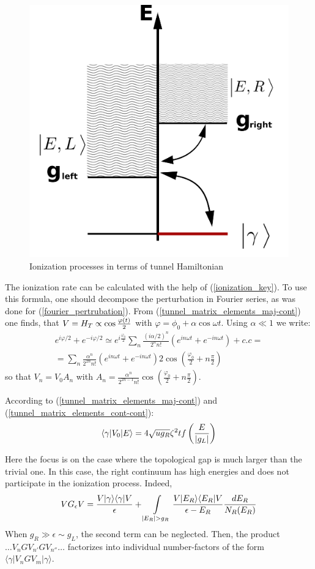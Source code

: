 \begin{figure}[H]
	\centering
	\includegraphics[width=0.6\linewidth]{images/tunneling}
	\caption{Ionization processes in terms of tunnel Hamiltonian}
	\label{fig:tunneling}
\end{figure}

The ionization rate can be calculated with the help of  (\ref{ionization_key}). To use this formula, one should decompose the  perturbation in Fourier series, as was done for (\ref{fourier_pertrubation}). From  (\ref{tunnel_matrix_elements_maj-cont}) one finds, that $ V=H_T\propto\cos\frac{\varphi\left(t\right)}{2} $ with $ \varphi=\phi_{0}+\alpha\cos\omega t $. Using $ \alpha\ll1 $ we write:
\begin{multline}
	e^{i\varphi/2}+e^{-i\varphi/2}\simeq e^{i\frac{\varphi_{0}}{2}}\sum_{n}\frac{(i\alpha/2)^{n}}{2^{n}n!}(e^{in\omega t}+e^{-in\omega t})+c.c=\\=\sum_{n}\frac{\alpha{}^{n}}{2^{2n}n!}(e^{in\omega t}+e^{-in\omega t})2\cos\left(\frac{\varphi_{0}}{2}+n\frac{\pi}{2}\right)
\end{multline}
so that $ V_{n}=V_{0}A_{n} $ with $ A_{n}=\frac{\alpha^{n}}{2^{2n-1}n!}\cos\left(\frac{\varphi_{0}}{2}+n\frac{\pi}{2}\right) $.

According to (\ref{tunnel_matrix_elements_maj-cont}) and (\ref{tunnel_matrix_elements_cont-cont}):
\begin{gather}
\label{tunnel_element_factorized}
	\langle\gamma|V_{0}|E\rangle=4\sqrt{ug_{R}}\zeta^{2}tf\left(\frac{E}{\left|g_L\right|}\right)
\end{gather}

Here the focus is on the case where the topological gap is much larger than the trivial one. In this case, the right continuum has high energies and does not participate in the ionization process. Indeed,
\begin{gather}
	VG_{\epsilon}V=\frac{V|\gamma\rangle\langle\gamma|V}{\epsilon}+\intop_{|E_{R}|>g_{R}}\frac{V|E_{R}\rangle\langle E_{R}|V}{\epsilon-E_{R}}\frac{dE_{R}}{N_{R}(E_{R})}
\end{gather}
When $ g_{R}\gg\epsilon\sim g_{L} $, the second term can be neglected. Then, the product $ \dots V_{n}GV_{n'}GV_{n''}\dots $ factorizes into individual number-factors of the form $ \langle\gamma|V_{n}GV_{m}|\gamma\rangle $.

